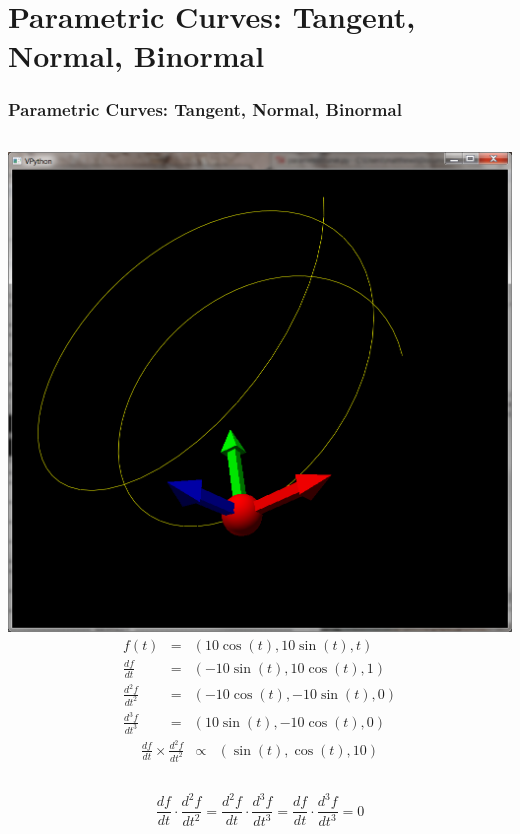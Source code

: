\documentclass[slidestop,xcolor=pst]{beamer}
\newcommand{\sect}[1]{
\section{#1}
\begin{frame}[fragile]\frametitle{#1}
}
\begin{document}
\sect{Parametric Curves: Tangent, Normal, Binormal}
\begin{columns}[c]
\includegraphics[width=\textwidth]{images/vpythoncurveframe.png}
\begin{eqnarray*}
f(t) &=& (10\cos(t), 10\sin(t), t)\\
\frac{df}{dt} &=& (-10\sin(t), 10\cos(t), 1)\\
\frac{d^2f}{dt^2} &=& (-10\cos(t), -10\sin(t), 0)\\
\frac{d^3f}{dt^3} &=& (10\sin(t), -10\cos(t), 0)
\end{eqnarray*}
\begin{eqnarray*}
\frac{df}{dt}\times \frac{d^2f}{dt^2} &\propto& (\sin(t), \cos(t), 10)
\end{eqnarray*}
\end{columns}
\bigskip
\[
\frac{df}{dt} \cdot \frac{d^2f}{dt^2}
=
\frac{d^2f}{dt} \cdot \frac{d^3f}{dt^3}
=
\frac{df}{dt} \cdot \frac{d^3f}{dt^3}
= 0
\]
\end{frame}
\end{document}
